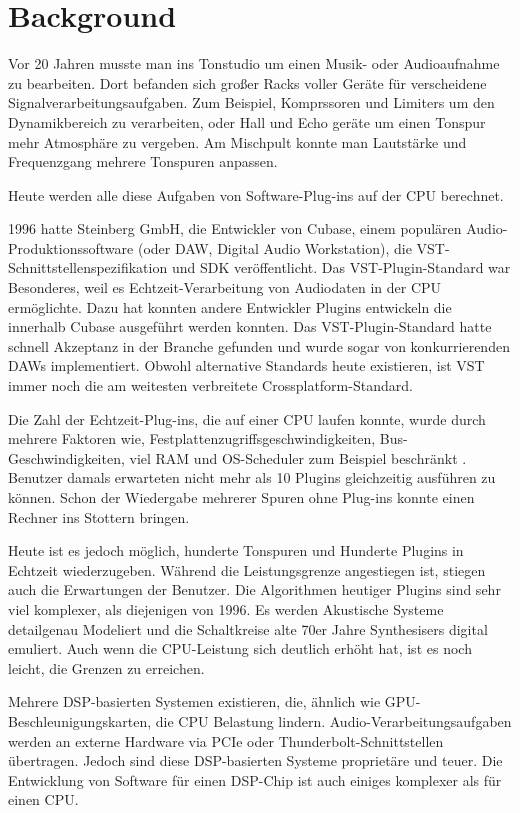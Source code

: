 \section{Background}

Vor 20 Jahren musste man ins Tonstudio um einen Musik- oder Audioaufnahme zu bearbeiten. Dort befanden sich großer Racks voller Geräte für verscheidene Signalverarbeitungsaufgaben. Zum Beispiel, Komprssoren und Limiters um den Dynamikbereich zu verarbeiten, oder Hall und Echo geräte um einen Tonspur mehr Atmosphäre zu vergeben. Am Mischpult konnte man Lautstärke und Frequenzgang mehrere Tonspuren anpassen.

Heute werden alle diese Aufgaben von Software-Plug-ins auf der CPU berechnet.

1996 hatte Steinberg GmbH, die Entwickler von Cubase, einem populären Audio-Produktionssoftware (oder DAW, Digital Audio Workstation), die VST-Schnittstellenspezifikation und SDK veröffentlicht. Das VST-Plugin-Standard war Besonderes, weil es Echtzeit-Verarbeitung von Audiodaten in der CPU ermöglichte. Dazu hat konnten andere Entwickler Plugins entwickeln die innerhalb Cubase ausgeführt werden konnten. Das VST-Plugin-Standard hatte schnell Akzeptanz in der Branche gefunden und wurde sogar von konkurrierenden DAWs implementiert. Obwohl alternative Standards heute existieren, ist VST immer noch die am weitesten verbreitete Crossplatform-Standard.

Die Zahl der Echtzeit-Plug-ins, die auf einer CPU laufen konnte, wurde durch mehrere Faktoren wie, Festplattenzugriffsgeschwindigkeiten, Bus-Geschwindigkeiten, viel RAM und OS-Scheduler zum Beispiel beschränkt \cite{brandt1998low}. Benutzer damals erwarteten nicht mehr als 10 Plugins gleichzeitig ausführen zu können. Schon der Wiedergabe mehrerer Spuren ohne Plug-ins konnte einen Rechner ins Stottern bringen.

Heute ist es jedoch möglich, hunderte Tonspuren und Hunderte Plugins in Echtzeit wiederzugeben. Während die Leistungsgrenze angestiegen ist, stiegen auch die Erwartungen der Benutzer. Die Algorithmen heutiger Plugins sind sehr viel komplexer, als diejenigen von 1996. Es werden Akustische Systeme detailgenau Modeliert und die Schaltkreise alte 70er Jahre Synthesisers digital emuliert. Auch wenn die CPU-Leistung sich deutlich erhöht hat, ist es noch leicht, die Grenzen zu erreichen.

Mehrere DSP-basierten Systemen existieren, die, ähnlich wie GPU-Beschleunigungskarten,  die CPU Belastung lindern. Audio-Verarbeitungsaufgaben werden an externe Hardware via PCIe oder Thunderbolt-Schnittstellen übertragen. Jedoch sind diese DSP-basierten Systeme proprietäre und teuer. Die Entwicklung von Software für einen DSP-Chip ist auch einiges komplexer als für einen CPU.